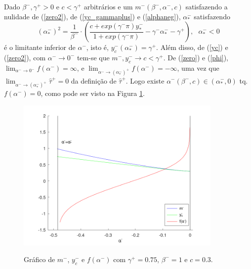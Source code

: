 Dado $\beta^-,\gamma^+>0$ e $c<\gamma^+$ arbitrários e um $m^-(\beta^-,\alpha^-, c)$ satisfazendo a nulidade de (\ref{zero2}), de (\ref{yc_gammaplus}) e (\ref{alphaneg}), $\alpha^-_*$ satisfazendo
\[
(\alpha^-_*)^2=\frac{1}{\beta^-}\cdot\left(\frac{c+exp(\gamma^-\pi)y_*^-}{1+exp(\gamma^-\pi)}-\gamma^-\alpha^-_*-\gamma^+\right),\text{ }\alpha^-_*<0
\]
é o limitante inferior de $\alpha^-$, isto é, $y_c^-(\alpha^-_*)=\gamma^+$. Além disso, de (\ref{yc}) e (\ref{zero2}), com $\alpha^-\to 0^-$ tem-se que $m^-, y_c^-\rightarrow c<\gamma^+$. De (\ref{zero}) e (\ref{phi}), $\lim_{\alpha^-\to 0^-} f(\alpha^-)=\infty$, e $\lim_{\alpha^-\to (\alpha^-_*)^+} f(\alpha^-)=-\infty$, uma vez que $\lim_{\alpha^-\to (\alpha^-_*)^+}\hat{\tau}^+= 0$ da definição de $\hat{\tau}^+$. Logo existe $\alpha^-(\beta^-, c)\in(\alpha^-_*,0)$ tq. $f(\alpha^-)=0$, como pode ser visto na Figura \ref{curve}.
\begin{figure}[H]
\centering
\includegraphics[width=10cm]{curve}\\
\vspace{\baselineskip}
\caption{\label{curve}Gráfico de $m^-$, $y_c^-$ e $f(\alpha^-)$ com $\gamma^+=0.75$, $\beta^-=1$ e $c=0.3$.}
\end{figure}

